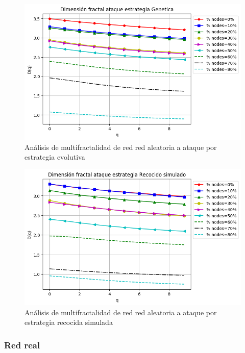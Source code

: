 \begin{figure}[H]
    \centering
    \includegraphics[scale=0.7]{Capitulo6MultifractalidadYRobustez/imagenes/grafica_DqGenetic20180501_072543Random1991Nodes5939.png}
    \caption{Análisis de multifractalidad de red red aleatoria a ataque por estrategia evolutiva }
\end{figure}

\begin{figure}[H]
    \centering
    \includegraphics[scale=0.7]{Capitulo6MultifractalidadYRobustez/imagenes/grafica_DqSimulated20180501_072543Random1991Nodes5939.png}
    \caption{Análisis de multifractalidad de red red aleatoria a ataque por estrategia recocida simulada }
\end{figure}

\subsubsection{Red real}

